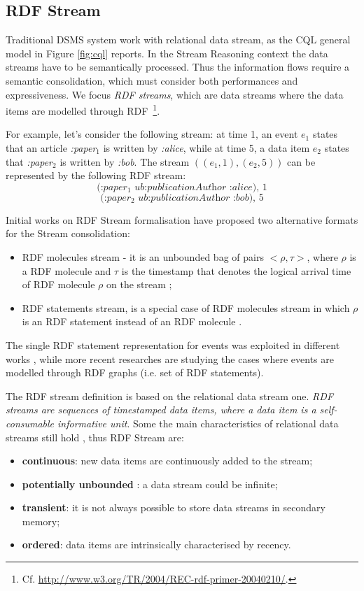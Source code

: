 \subsection{RDF Stream}\label{sec:rdfstream}

Traditional DSMS system work with relational data stream, as the CQL general model in Figure \ref{fig:cql} reports. In the Stream Reasoning context the data streams have to be semantically processed. Thus the information flows require a semantic consolidation, which must consider both performances and expressiveness. We focus \textit{RDF streams}, which are data streams where the data items are modelled through RDF~\footnote{Cf. \url{http://www.w3.org/TR/2004/REC-rdf-primer-20040210/}.}. 

For example, let's consider the following stream: at time 1, an event $e_1$ states that an article \textit{:paper$_1$} is written by \textit{:alice}, while at time 5, a data item $e_2$ states that \textit{:paper$_2$} is written by \textit{:bob}. The stream $((e_1,1),(e_2,5))$ can be represented by the following RDF stream:
\[\textit{(:paper$_1$ ub:publicationAuthor :alice), 1}\]
\[\textit{(:paper$_2$ ub:publicationAuthor :bob), 5}\]

Initial works on RDF Stream formalisation have proposed two alternative formats for the Stream consolidation\cite{DBLP:conf/fis/ValleCBBC08}:
\begin{itemize}
\item RDF molecules stream - it is an unbounded bag of pairs $< \rho, \tau >$, where $\rho$ is a RDF molecule \cite{TrackingMolecules} and $\tau$ is the timestamp that denotes the logical arrival time of RDF molecule $\rho$ on the stream \cite{DBLP:conf/fis/ValleCBBC08};
\item RDF statements stream, is a special case of RDF molecules stream in which $\rho$ is an RDF statement instead of an RDF molecule  .
\end{itemize} 

The single RDF statement representation for events was exploited in different works  \cite{Barbieri2010,Lephuoc2011}, while more recent researches \cite{DBLP:conf/semweb/BalduiniVDTPC13} are studying the cases where events are modelled through RDF graphs (i.e. set of RDF statements). 

The  RDF stream  definition is based on the relational data stream one. \textit{RDF streams are sequences of timestamped data items, where a data item is a self- consumable informative unit}. Some the main characteristics of relational data streams still hold \cite{DBLP:conf/pods/BabcockBDMW02}, thus RDF Stream are:
\begin{itemize}
\item \textbf{continuous}: new data items are continuously added to the stream;
\item \textbf{potentially unbounded} : a data stream could be infinite;
\item \textbf{transient}: it is not always possible to store data streams in secondary memory;
\item \textbf{ordered}: data items are intrinsically characterised by recency.
\end{itemize}

